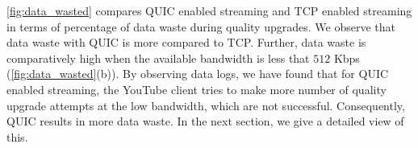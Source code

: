 \fig\ref{fig:data_wasted} compares \ac{QUIC} enabled streaming and \ac{TCP} enabled streaming in terms of percentage of data waste during quality upgrades. 
We observe that data waste with \ac{QUIC} is more compared to \ac{TCP}. Further, data waste is comparatively high when the available bandwidth is less that $512$ Kbps (\fig\ref{fig:data_wasted}(b)). 
By observing data logs, we have found that for \ac{QUIC} enabled streaming, the YouTube client tries to make more number of quality upgrade attempts at the low bandwidth, which are not successful. 
Consequently, \ac{QUIC} results in more data waste. In the next section, we give a detailed view of this. 


